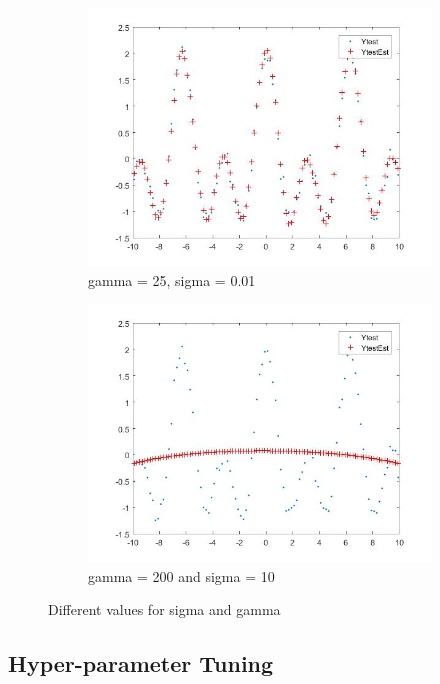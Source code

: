 \documentclass[11pt,oneside,a4paper]{article}
\begin{document}
\begin{figure}[H]
\begin{subfigure}[b]{0.4\textwidth}
		\includegraphics[width=\textwidth]{../Figures/sig_gama_25_01}
		\caption{gamma = 25, sigma = 0.01}
	\end{subfigure}
	\begin{subfigure}[b]{0.4\textwidth}
		\includegraphics[width=\textwidth]{../Figures/sig_gama_200_1}
		\caption{gamma = 200 and sigma = 10}
	\end{subfigure}
	\caption{Different values for sigma and gamma}
	
\end{figure}

\subsection{Hyper-parameter Tuning}
\end{document}
